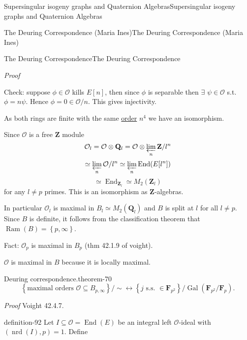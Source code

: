 \documentclass[10pt,]{book}
\makeatletter
\renewcommand*{\proofname}{Proof}
\renewenvironment{proof}[1][\proofname]{\par
  \pushQED{\qed}%
  \normalfont \topsep6\p@\@plus6\p@\relax
  \trivlist
  \item\relax
    {\itshape
    #1\@addpunct{.}}\hspace\labelsep\ignorespaces
}{%
  \popQED\endtrivlist\@endpefalse
}
\numberwithin{equation}{section}
\newcommand{\lb}{[}
\newcommand{\rb}{]}
\newcommand{\ZZ}{\mathbf{Z}}
\newcommand{\QQ}{\mathbf{Q}}
\newcommand{\FF}{\mathbf{F}}
\newcommand{\ints}{\mathcal{O}}
\DeclareMathOperator{\End}{End}
\newcommand{\Gal}[2]{\operatorname{Gal}(#1/#2)}
\makeatother
\begin{document}
\begin{chapterptx}{Supersingular isogeny graphs and Quaternion Algebras}{}{Supersingular isogeny graphs and Quaternion Algebras}{}{}
\begin{sectionptx}{The Deuring Correspondence (Maria Ines)}{}{The Deuring Correspondence (Maria Ines)}{}{}
\begin{subsectionptx}{The Deuring Correspondence}{}{The Deuring Correspondence}{}{}
\begin{proof}
Check: suppose \(\phi \in  \ints\) kills \(E\lb n \rb\), then since \(\phi\) is separable then \(\exists\) \(\psi \in \ints\) s.t. \(\phi = n \psi\). Hence \(\phi = 0 \in \ints/n\). This gives injectivity.%
\par
\hypertarget{p-962}{}%
As both rings are finite with the same \hyperref[def-order-quaternion]{order} \(n^4\) we have an isomorphism.%
\par
\hypertarget{p-963}{}%
Since \(\ints\) is a free \(\ZZ\) module%
\begin{equation*}
\ints_l = \ints \otimes \QQ_l = \ints \otimes \varprojlim _n \ZZ/l^n
\end{equation*}
%
\begin{equation*}
\simeq \varprojlim_n \ints/l^n \simeq \varprojlim_n \End(E[l^n])
\end{equation*}
%
\begin{equation*}
\simeq \End_{\ZZ_l}  \simeq M_2( \ZZ_l)
\end{equation*}
for any \(l \ne p\) primes. This is an isomorphism as \(\ZZ\)-algebras.%
\par
\hypertarget{p-964}{}%
In particular \(\ints_l\) is maximal in \(B_l \simeq M_2(\QQ_l)\) and \(B\) is split at \(l\) for all \(l\ne p\). Since \(B\) is definite, it follows from the classification theorem that \(\operatorname{Ram}(B)  = \left\{ p, \infty \right\}\).%
\par
\hypertarget{p-965}{}%
Fact: \(\ints_p\) is maximal in \(B_p\) (thm 42.1.9 of voight).%
\par
\hypertarget{p-966}{}%
\(\ints\) is maximal in \(B\) because it is locally maximal.%
\end{proof}
\begin{theorem}{Deuring correspondence.}{}{theorem-70}%
\hypertarget{p-967}{}%
%
\begin{equation*}
\left\{ \text{maximal orders }\ints \subseteq B_{p,\infty}\right\}/\sim \leftrightarrow \left\{ j \text{ s.s. }\in \FF_{p^2}\right\}/\Gal{\FF_{p^2}}{\FF_p}\text{.}
\end{equation*}
%
\end{theorem}
\begin{proof}\hypertarget{proof-108}{}
\hypertarget{p-968}{}%
Voight 42.4.7.%
\end{proof}
\begin{definition}{}{definition-92}%
\hypertarget{p-969}{}%
Let \(I \subseteq \ints = \End(E)\) be an integral left \(\ints\)-ideal with \((\operatorname{nrd}(I), p) = 1\). Define%
\begin{equation*}

\end{equation*}
\end{definition}
\end{subsectionptx}
\end{sectionptx}
\end{chapterptx}
\end{document}
